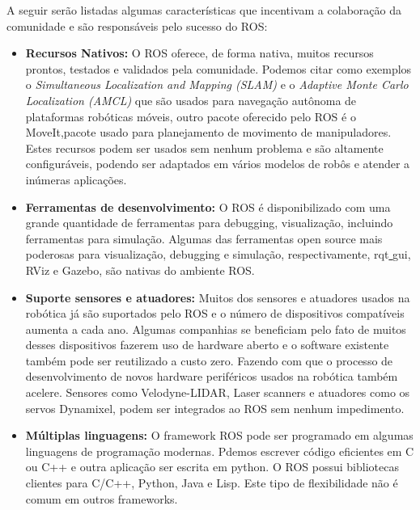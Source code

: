 A seguir serão listadas algumas características que incentivam a colaboração da comunidade e são responsáveis pelo sucesso do ROS\@:

\begin{itemize}
    \item\textbf{Recursos Nativos:} O ROS oferece, de forma nativa, muitos recursos prontos, testados e validados pela comunidade. Podemos citar como exemplos o \textit{Simultaneous Localization and Mapping (SLAM)} e o \textit{Adaptive Monte Carlo Localization (AMCL)} que são usados para navegação autônoma de plataformas robóticas móveis, outro pacote oferecido pelo ROS é o MoveIt,pacote usado para planejamento de movimento de manipuladores. Estes recursos podem ser usados sem nenhum problema e são altamente configuráveis, podendo ser adaptados em vários modelos de robôs e atender a inúmeras aplicações. 

    \item\textbf{Ferramentas de desenvolvimento:} O ROS é disponibilizado com uma grande quantidade de ferramentas para debugging, visualização, incluindo ferramentas para simulação. Algumas das ferramentas open source mais poderosas para visualização, debugging e  simulação, respectivamente, rqt\underline{ }gui, RViz e Gazebo, são nativas do ambiente ROS\@.
    
    
    \item\textbf{Suporte sensores e atuadores:} Muitos dos sensores e atuadores usados na robótica já são suportados pelo ROS e o número de dispositivos compatíveis aumenta a cada ano. Algumas companhias se beneficiam pelo fato de muitos desses dispositivos fazerem uso de hardware aberto e o software existente também pode ser reutilizado a custo zero. Fazendo com que o processo de desenvolvimento de novos hardware periféricos usados na robótica também acelere. Sensores como Velodyne-LIDAR, Laser scanners e atuadores como os servos Dynamixel, podem ser integrados ao ROS sem nenhum impedimento.
    
    \item\textbf{Múltiplas linguagens:} O framework ROS pode ser programado em algumas linguagens de programação modernas. Pdemos escrever código eficientes em C ou C++ e outra aplicação ser escrita em python. O ROS possui bibliotecas clientes para C/C++, Python, Java e Lisp. Este tipo de flexibilidade não é comum em outros frameworks.
    
\end{itemize}




